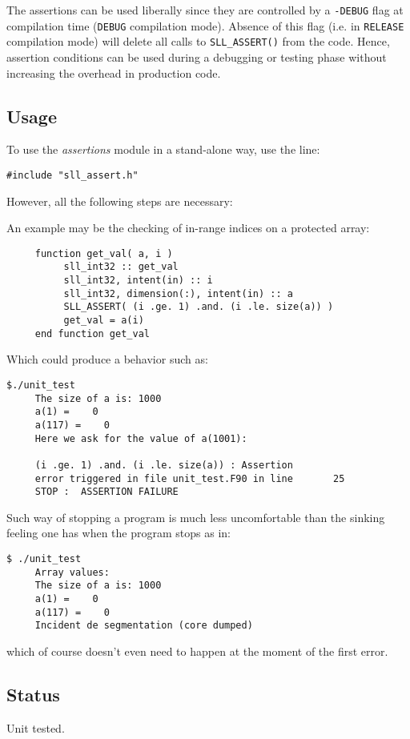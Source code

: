 \documentclass[]{report}   %
\begin{document}
The assertions can be used liberally since they are controlled by a \verb+-DEBUG+ flag at compilation time (\verb+DEBUG+ compilation mode). Absence of this flag (i.e. in \verb+RELEASE+ compilation mode) will delete all calls to \verb+SLL_ASSERT()+ from the code. Hence, assertion conditions can be used during a debugging or testing phase without increasing the overhead in production code.

\subsection{Usage}
To use the \emph{assertions} module in a stand-alone way, use the line:
\begin{verbatim}
#include "sll_assert.h"
\end{verbatim}
However, all the following steps are necessary:

An example may be the checking of in-range indices on a protected array:

\begin{verbatim}
     function get_val( a, i )
          sll_int32 :: get_val
          sll_int32, intent(in) :: i
          sll_int32, dimension(:), intent(in) :: a
          SLL_ASSERT( (i .ge. 1) .and. (i .le. size(a)) )
          get_val = a(i)
     end function get_val
\end{verbatim}
Which could produce a behavior such as:
\begin{verbatim}
$./unit_test
     The size of a is: 1000
     a(1) =    0
     a(117) =    0
     Here we ask for the value of a(1001):

     (i .ge. 1) .and. (i .le. size(a)) : Assertion 
     error triggered in file unit_test.F90 in line       25
     STOP :  ASSERTION FAILURE
\end{verbatim}
Such way of stopping a program is much less uncomfortable than the sinking feeling one has when the program stops as in:
\begin{verbatim}
$ ./unit_test
     Array values: 
     The size of a is: 1000
     a(1) =    0
     a(117) =    0
     Incident de segmentation (core dumped)
\end{verbatim}
which of course doesn't even need to happen at the moment of the first error.

\subsection{Status}
Unit tested.
\end{document}
